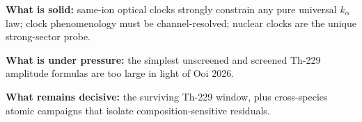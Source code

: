 \begin{tcolorbox}[colback=green!5!white,colframe=green!60!black,title=Clock-Sector v3.2 Summary]
\textbf{What is solid:} same-ion optical clocks strongly constrain any pure universal $k_\alpha$ law; clock phenomenology must be channel-resolved; nuclear clocks are the unique strong-sector probe.

\textbf{What is under pressure:} the simplest unscreened and screened Th-229 amplitude formulas are too large in light of Ooi 2026.

\textbf{What remains decisive:} the surviving Th-229 window, plus cross-species atomic campaigns that isolate composition-sensitive residuals.
\end{tcolorbox}
